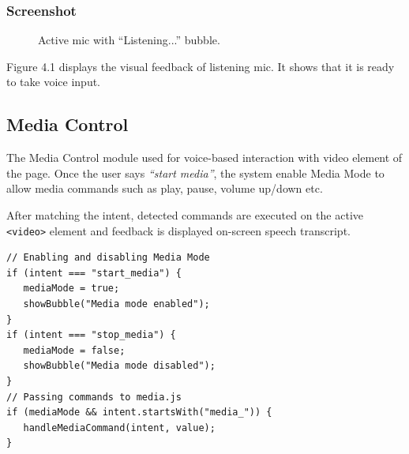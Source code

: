 \subsubsection*{Screenshot}
\begin{figure}[htbp] 
    \centering
    \caption{ Active mic with “Listening...” bubble.}
    \label{fig:active_mic}
\end{figure}

Figure 4.1 displays the visual feedback of listening mic. It shows that it is ready to take voice input.

\subsection{Media Control}

The Media Control module used for voice-based interaction with video element of the page. 
Once the user says \textit{``start media''}, the system enable Media Mode to allow media commands such as play, pause, volume up/down etc. 

After matching the intent, detected commands are executed on the active \texttt{<video>} element and feedback is displayed on-screen speech transcript.

\begin{verbatim}
// Enabling and disabling Media Mode
if (intent === "start_media") {
   mediaMode = true;
   showBubble("Media mode enabled");
}
if (intent === "stop_media") {
   mediaMode = false;
   showBubble("Media mode disabled");
}
// Passing commands to media.js
if (mediaMode && intent.startsWith("media_")) {
   handleMediaCommand(intent, value);
}
\end{verbatim}

